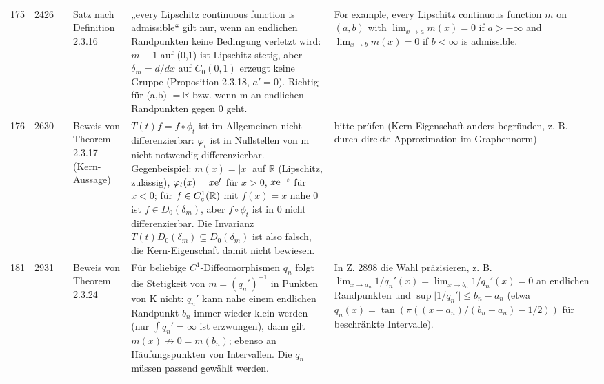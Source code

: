 \documentclass[10pt]{article}
\begin{document}
\begin{longtable}{@{}rrc>{\RaggedRight\arraybackslash}p{3.0cm}>{\RaggedRight\arraybackslash}p{11.4cm}>{\RaggedRight\arraybackslash}p{7.4cm}@{}}
175 & 2426 & \sichB{} & Satz nach Definition 2.3.16 & „every Lipschitz continuous function is admissible“ gilt nur, wenn an endlichen Randpunkten keine Bedingung verletzt wird: $m \ensuremath{\equiv} 1$ auf (0,1) ist Lipschitz-stetig, aber $\ensuremath{\delta}_m = d/dx$ auf $C_0(0,1)$ erzeugt keine Gruppe (Proposition 2.3.18, $a' = 0$). Richtig für (a,b) $= \ensuremath{\mathbb{R}}$ bzw. wenn m an endlichen Randpunkten gegen 0 geht. & {For example, every Lipschitz continuous function $m$ on $(a,b)$ with $\lim_{x \to a} m(x) = 0$ if $a > -\infty$ and $\lim_{x \to b} m(x) = 0$ if $b < \infty$ is admissible.} \\[2pt]
176 & 2630 & \sichA{} & Beweis von Theorem 2.3.17 (Kern-Aussage) & $T(t)f = f \circ \phi_{t}$ ist im Allgemeinen nicht differenzierbar: $\ensuremath{\varphi}_t$ ist in Nullstellen von m nicht notwendig differenzierbar. Gegenbeispiel: $m(x) = \vert x\vert$ auf $\ensuremath{\mathbb{R}}$ (Lipschitz, zulässig), $\phi_{t}(x) = x\eu^{t}$ für $x > 0$, $x\mathrm{e}^{-t}$ für $x < 0$; für $f \in C_{c}^{1}(\mathbb{R})$ mit $f(x) = x$ nahe 0 ist $f \in D_{0}(\delta_{m})$, aber $f \circ \phi_{t}$ ist in 0 nicht differenzierbar. Die Invarianz $T(t)D_{0}(\delta_{m}) \subseteq D_{0}(\delta_{m})$ ist also falsch, die Kern-Eigenschaft damit nicht bewiesen. & bitte prüfen (Kern-Eigenschaft anders begründen, z. B. durch direkte Approximation im Graphennorm) \\[2pt]
181 & 2931 & \sichB{} & Beweis von Theorem 2.3.24 & Für beliebige $C\ensuremath{^{1}}$-Diffeomorphismen $q_n$ folgt die Stetigkeit von $m = (q_{n}')^{-1}$ in Punkten von K nicht: $q_n'$ kann nahe einem endlichen Randpunkt $b_n$ immer wieder klein werden (nur $\int q_{n}' = \infty$ ist erzwungen), dann gilt $m(x) \not\to 0 = m(b_{n})$; ebenso an Häufungspunkten von Intervallen. Die $q_n$ müssen passend gewählt werden. & In Z. 2898 die Wahl präzisieren, z. B. $\lim_{x \to a_{n}} 1/q_{n}'(x) = \lim_{x \to b_{n}} 1/q_{n}'(x) = 0$ an endlichen Randpunkten und $\sup \vert 1/q_{n}'\vert \leq b_{n} - a_{n}$ (etwa $q_{n}(x) = \tan(\pi((x-a_{n})/(b_{n}-a_{n}) - 1/2))$ für beschränkte Intervalle). \\
\end{longtable}
\end{document}
